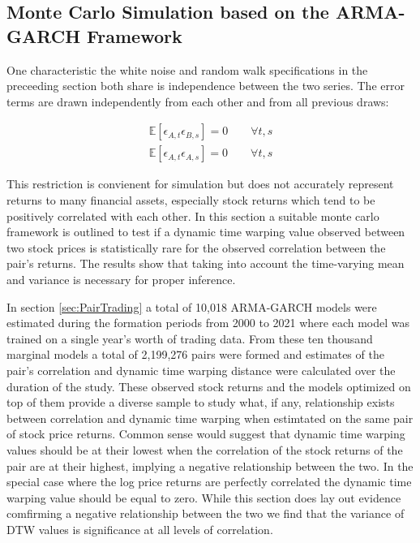 \documentclass[12pt]{article}
\begin{document}
\subsection{Monte Carlo Simulation based on the ARMA-GARCH Framework} \label{sec:MC_sim_arma_garch}

One characteristic the white noise and random walk specifications in the preceeding section both share is independence between the two series. The error terms are drawn independently from each other and from all previous draws:

\begin{align}
    \mathbb{E}[\epsilon_{A,t}\epsilon_{B,s}] = 0 \quad \quad \forall t,s \\
    \mathbb{E}[\epsilon_{A,t}\epsilon_{A,s}] = 0 \quad \quad \forall t,s
\end{align}

This restriction is convienent for simulation but does not accurately represent returns to many financial assets, especially stock returns which tend to be positively correlated with each other. In this section a suitable monte carlo framework is outlined to test if a dynamic time warping value observed between two stock prices is statistically rare for the observed correlation between the pair's returns. The results show that taking into account the time-varying mean and variance is necessary for proper inference.

In section \ref{sec:PairTrading} a total of 10,018 ARMA-GARCH models were estimated during the formation periods from 2000 to 2021 where each model was trained on a single year's worth of trading data. From these ten thousand marginal models a total of 2,199,276 pairs were formed and estimates of the pair's correlation and dynamic time warping distance were calculated over the duration of the study. These observed stock returns and the models optimized on top of them provide a diverse sample to study what, if any, relationship exists between correlation and dynamic time warping when estimtated on the same pair of stock price returns. Common sense would suggest that dynamic time warping values should be at their lowest when the correlation of the stock returns of the pair are at their highest, implying a negative relationship between the two. In the special case where the log price returns are perfectly correlated the dynamic time warping value should be equal to zero. While this section does lay out evidence comfirming a negative relationship between the two we find that the variance of DTW values is significance at all levels of correlation. 
\end{document}
